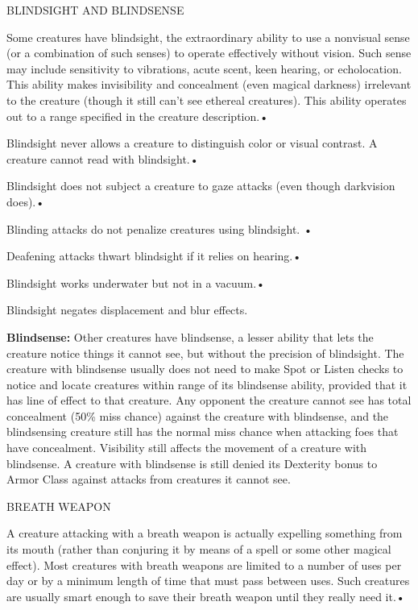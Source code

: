 \documentclass{article}
\begin{document}
\vspace{12pt}
BLINDSIGHT AND BLINDSENSE

Some creatures have blindsight, the extraordinary ability to use a nonvisual sense 
(or a combination of such senses) to operate effectively without vision. Such sense 
may include sensitivity to vibrations, acute scent, keen hearing, or echolocation. 
This ability makes invisibility and concealment (even magical darkness) irrelevant 
to the creature (though it still can't see ethereal creatures). This ability operates 
out to a range specified in the creature description.• 

\parindent=3pt
Blindsight never allows a creature to distinguish color or visual contrast. A creature 
cannot read with blindsight.• 

Blindsight does not subject a creature to gaze attacks (even though darkvision 
does).• 

\parindent=7pt
Blinding attacks do not penalize creatures using blindsight. • 

\parindent=3pt
Deafening attacks thwart blindsight if it relies on hearing.• 

Blindsight works underwater but not in a vacuum.• 

\parindent=7pt
Blindsight negates displacement and blur effects.

\parindent=0pt
\textbf{Blindsense:} Other creatures have blindsense, a lesser ability that lets 
the creature notice things it cannot see, but without the precision of blindsight. 
The creature with blindsense usually does not need to make Spot or Listen checks 
to notice and locate creatures within range of its blindsense ability, provided 
that it has line of effect to that creature. Any opponent the creature cannot see 
has total concealment (50\% miss chance) against the creature with blindsense, 
and the blindsensing creature still has the normal miss chance when attacking foes 
that have concealment. Visibility still affects the movement of a creature with 
blindsense. A creature with blindsense is still denied its Dexterity bonus to Armor 
Class against attacks from creatures it cannot see.

\vspace{12pt}
BREATH WEAPON

A creature attacking with a breath weapon is actually expelling something from 
its mouth (rather than conjuring it by means of a spell or some other magical effect). 
Most creatures with breath weapons are limited to a number of uses per day or by 
a minimum length of time that must pass between uses. Such creatures are usually 
smart enough to save their breath weapon until they really need it.• 
\end{document}
